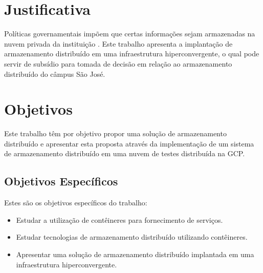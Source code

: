 \section{Justificativa}

Políticas governamentais impõem que certas informações sejam armazenadas na nuvem privada da instituição \cite{boaspraticas}. Este trabalho apresenta a implantação de armazenamento distribuído em uma infraestrutura hiperconvergente, o qual pode servir de subsídio para tomada de decisão em relação ao armazenamento distribuído do câmpus São José.

\section{Objetivos}

Este trabalho têm por objetivo propor uma solução de armazenamento distribuído e apresentar esta proposta através da implementação de um sistema de armazenamento distribuído em uma nuvem de testes distribuída na \ac{GCP}.

\subsection{Objetivos Específicos}

Estes são os objetivos específicos do trabalho:

\begin{itemize}
    \item Estudar a utilização de contêineres para fornecimento de serviços.
    \item Estudar tecnologias de armazenamento distribuído utilizando contêineres.
    \item Apresentar uma solução de armazenamento distribuído implantada em uma infraestrutura hiperconvergente.
\end{itemize}